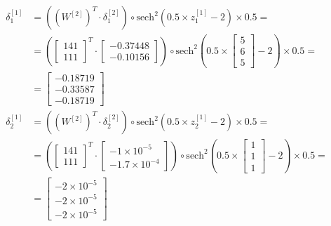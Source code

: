 \documentclass[12pt]{article}
\begin{document}
\begin{enumerate}[leftmargin=\labelsep]
        \begingroup
        \allowdisplaybreaks
          \begin{align*}
              \delta^{[1]}_1 &= \left(\left(W^{[2]}\right)^{T} \cdot \delta^{[2]}_1\right) \circ \text{sech}^{2}\left(0.5 \times z^{[1]}_1 - 2\right) \times 0.5 = \\
             &= \left(\begin{bmatrix} 1 4 1 \\ 1 1 1 \end{bmatrix}^{T} \cdot \begin{bmatrix} -0.37448 \\ -0.10156 \end{bmatrix}\right) \circ \text{sech}^{2}\left(0.5 \times \begin{bmatrix}  5 \\ 6 \\ 5 \end{bmatrix} - 2\right) \times 0.5 = \\
             &= \begin{bmatrix} -0.18719 \\ -0.33587 \\ -0.18719\end{bmatrix} \\
                 \delta^{[1]}_2 &= \left(\left(W^{[2]}\right)^{T} \cdot \delta^{[2]}_2\right) \circ  \text{sech}^{2}\left(0.5\times z^{[1]}_2 - 2\right) \times 0.5 = \\
             &= \left(\begin{bmatrix} 1 4 1 \\ 1 1 1 \end{bmatrix}^{T} \cdot \begin{bmatrix} -1 \times 10^{-5} \\ -1.7 \times 10^{-4} \end{bmatrix}\right) \circ \text{sech}^{2}\left(0.5\times\begin{bmatrix}  1 \\ 1 \\ 1 \end{bmatrix} - 2\right) \times 0.5 = \\
             &= \begin{bmatrix} -2 \times 10^{-5} \\ -2 \times 10^{-5} \\ -2 \times 10^{-5}\end{bmatrix}
          \end{align*}
        \endgroup


\end{enumerate}
\end{document}
